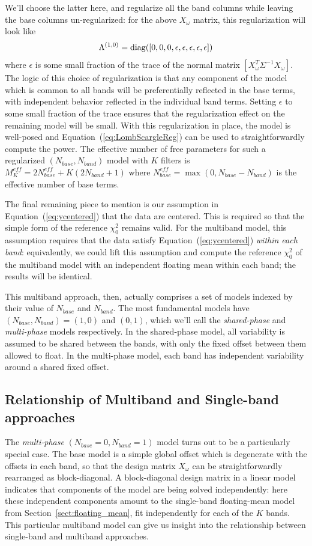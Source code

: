 \documentclass[12pt,preprint]{aastex}
\newcommand{\Eq}[1]{Equation~(\ref{eq:#1})}
\newcommand{\eq}[1]{\Eq{#1}}
\newcommand{\Sect}[1]{Section~\ref{sect:#1}}
\newcommand{\sect}[1]{\Sect{#1}}
\newcommand{\sectlabel}[1]{\label{sect:#1}}
\begin{document}
We'll choose the latter here, and regularize all the band columns while leaving the base columns un-regularized: for the above $X_\omega$ matrix, this regularization will look like
\begin{equation}
  \Lambda^{(1,0)} = {\rm diag}([0, 0, 0, \epsilon, \epsilon, \epsilon, \epsilon, \epsilon])
\end{equation}
where $\epsilon$ is some small fraction of the trace of the normal matrix $[X_\omega^T\Sigma^{-1}X_\omega]$. The logic of this choice of regularization is that any component of the model which is common to all bands will be preferentially reflected in the base terms, with independent behavior reflected in the individual band terms. Setting $\epsilon$ to some small fraction of the trace ensures that the regularization effect on the remaining model will be small. With this regularization in place, the model is well-posed and \eq{LombScargleReg} can be used to straightforwardly compute the power. The effective number of free parameters for such a regularized $(N_{base}, N_{band})$ model with $K$ filters is
$M_K^{eff} = 2N_{base}^{eff} + K(2N_{band} + 1)$ where $N_{base}^{eff} = \max(0, N_{base} - N_{band})$ is the effective number of base terms.

The final remaining piece to mention is our assumption in \eq{ycentered} that the data are centered. This is required so that the simple form of the reference $\chi^2_0$ remains valid. For the multiband model, this assumption requires that the data satisfy \eq{ycentered} {\it within each band}: equivalently, we could lift this assumption and compute the reference $\chi^2_0$ of the multiband model with an independent floating mean within each band; the results will be identical.

This multiband approach, then, actually comprises a set of models indexed by their value of $N_{base}$ and $N_{band}$. The most fundamental models have $(N_{base}, N_{band}) = (1,0)$ and $(0,1)$, which we'll call the {\it shared-phase} and {\it multi-phase} models respectively. In the shared-phase model, all variability is assumed to be shared between the bands, with only the fixed offset between them allowed to float. In the multi-phase model, each band has independent variability around a shared fixed offset.

\subsection{Relationship of Multiband and Single-band approaches}
\sectlabel{relationship}
The {\it multi-phase} $(N_{base}=0, N_{band}=1)$ model turns out to be a particularly special case.
The base model is a simple global offset which is degenerate with the offsets in each band, so that the design matrix $X_\omega$ can be straightforwardly rearranged as block-diagonal. A block-diagonal design matrix in a linear model indicates that components of the model are being solved independently: here these independent components amount to the single-band floating-mean model from \sect{floating_mean}, fit independently for each of the $K$ bands. This particular multiband model can give us insight into the relationship between single-band and multiband approaches.
\end{document}
